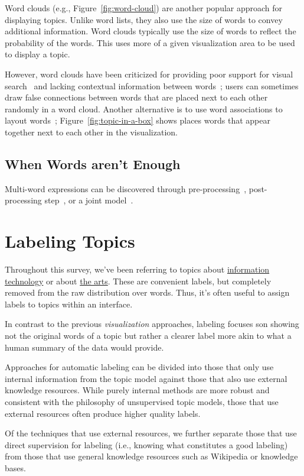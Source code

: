 Word clouds (e.g., Figure~\ref{fig:word-cloud}) are another popular approach for
displaying topics.  Unlike word lists, they also use the size of words to convey
additional information. Word clouds typically use the size of words to reflect
the probability of the words.  This uses more of a given visualization area to
be used to display a topic.

However, word clouds have been criticized for providing poor support for visual
search~\cite{Viegas2008} and lacking contextual information between
words~\cite{harris11}; users can sometimes draw false connections between words
that are placed next to each other randomly in a word cloud.  Another
alternative is to use word associations to layout
words~\citep{Smith:Chuang:Hu:Boyd-Graber:Findlater-2014};
Figure~\ref{fig:topic-in-a-box} shows places words that appear together next to
each other in the visualization.

\subsection{When Words aren't Enough}

Multi-word expressions can be discovered through
pre-processing~\citep{talley-11}, post-processing step~\citep{blei-09b},
or a joint model~\citep{johnson-10}.

\section{Labeling Topics}

Throughout this survey, we've been referring to topics about
\underline{information technology} or about \underline{the arts}.  These are
convenient labels, but completely removed from the raw distribution over words.
Thus, it's often useful to assign labels to topics within an interface.

In contrast to the previous \emph{visualization} approaches, labeling
focuses son showing not the original words of a topic but rather a
clearer label more akin to what a human summary of the data would
provide.

Approaches for automatic labeling can be divided into those that only
use internal information from the topic model against those that also
use external knowledge resources.  While purely internal methods are
more robust and consistent with the philosophy of unsupervised topic
models, those that use external resources often produce higher quality
labels.

Of the techniques that use external resources, we further separate
those that use direct supervision for labeling (i.e., knowing what
constitutes a good labeling) from those that use general knowledge
resources such as Wikipedia or knowledge bases.

